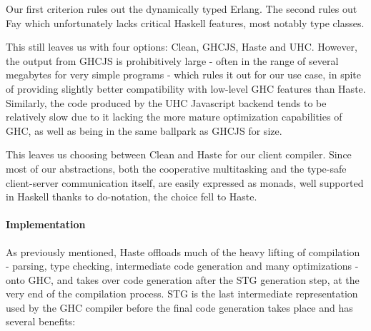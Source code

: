 \documentclass[preprint]{sigplanconf}
\begin{document}
Our first criterion rules out the dynamically typed Erlang. The second rules
out Fay which unfortunately lacks critical Haskell features, most notably type
classes.

This still leaves us with four options: Clean, GHCJS, Haste and UHC. However,
the output from GHCJS is prohibitively large - often in the range of several
megabytes for very simple programs - which rules it out for our use case, in
spite of providing slightly better compatibility with low-level GHC features
than Haste. Similarly, the code produced by the UHC Javascript backend tends to
be relatively slow due to it lacking the more mature optimization capabilities
of GHC, as well as being in the same ballpark as GHCJS for size.\ \cite{haste}

This leaves us choosing between Clean and Haste for our client compiler. Since
most of our abstractions, both the cooperative multitasking and the type-safe
client-server communication itself, are easily expressed as monads, well
supported in Haskell thanks to do-notation, the choice fell to Haste.

\paragraph{Implementation} As previously mentioned, Haste offloads much of the
heavy lifting of compilation - parsing, type checking, intermediate code
generation and many optimizations - onto GHC, and takes over code generation
after the STG generation step, at the very end of the compilation process.
STG is the last intermediate representation used by the GHC compiler before
the final code generation takes place and has several benefits:
\end{document}
